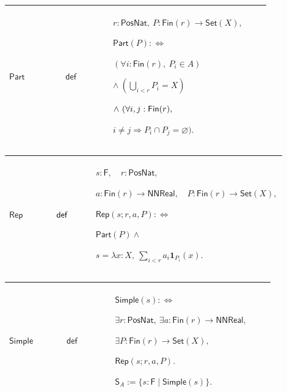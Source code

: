 \documentclass[12pt,reqno]{amsart}
\theoremstyle{blueplain}
\numberwithin{equation}{section}
\begin{document}
{\scriptsize \setlength{\parskip}{0pt}\nointerlineskip
\noindent 
\begin{tabular}{|@{}>{\centering\arraybackslash}m{0.19251\linewidth}|>{\centering\arraybackslash}m{0.16845\linewidth}|>{\centering\arraybackslash}m{0.53904\linewidth}|}
\hline
\hypertarget{def:Part}{$\displaystyle \mathsf{Part}$} & $\displaystyle 
\mathsf{def}$ & $\displaystyle r:\mathsf{PosNat},\ P:\mathsf{Fin}(r)\to%
\mathsf{Set}(X),$\par$\displaystyle \mathsf{Part}(P):\Longleftrightarrow$\par%
$\displaystyle (\forall i:\mathsf{Fin}(r),\ P_i\in A)$\par$\displaystyle %
\land\ (\bigcup_{i<r}P_i=X)$\par$\displaystyle \land\ (\forall i,j:\mathsf{%
Fin}(r),$\par$\displaystyle i\ne j\Rightarrow P_i\cap P_j=\varnothing).$ \\ 
\hline
\end{tabular}%
}

{\scriptsize \setlength{\parskip}{0pt}\nointerlineskip
\noindent 
\begin{tabular}{|@{}>{\centering\arraybackslash}m{0.19251\linewidth}|>{\centering\arraybackslash}m{0.16845\linewidth}|>{\centering\arraybackslash}m{0.53904\linewidth}|}
\hline
\hypertarget{def:Rep}{$\displaystyle \mathsf{Rep}$} & $\displaystyle \mathsf{%
def}$ & $\displaystyle s:\mathsf{F},\quad r:\mathsf{PosNat},$\par$%
\displaystyle a:\mathsf{Fin}(r)\to\mathsf{NNReal},\quad P:\mathsf{Fin}(r)\to%
\mathsf{Set}(X),$\par$\displaystyle \mathsf{Rep}(s;r,a,P):%
\Longleftrightarrow $\par$\displaystyle \mathsf{Part}(P)\land$\par$%
\displaystyle s=\lambda x:X,\ \sum_{i<r}a_i\mathbf{1}_{P_i}(x).$ \\ \hline
\end{tabular}%
}

{\scriptsize \setlength{\parskip}{0pt}\nointerlineskip
\noindent 
\begin{tabular}{|@{}>{\centering\arraybackslash}m{0.19251\linewidth}|>{\centering\arraybackslash}m{0.16845\linewidth}|>{\centering\arraybackslash}m{0.53904\linewidth}|}
\hline
\hypertarget{def:Simple}{$\displaystyle \mathsf{Simple}$} & $\displaystyle 
\mathsf{def}$ & $\displaystyle \mathsf{Simple}(s):\Longleftrightarrow$\par$%
\displaystyle \exists r:\mathsf{PosNat},\ \exists a:\mathsf{Fin}(r)\to%
\mathsf{NNReal},$\par$\displaystyle \exists P:\mathsf{Fin}(r)\to\mathsf{Set}%
(X),$\par$\displaystyle \mathsf{Rep}(s;r,a,P).$\par$\displaystyle \mathsf{S}%
_A:=\{s:\mathsf{F}\mid\mathsf{Simple}(s)\}.$ \\ \hline
\end{tabular}%
}
\end{document}
